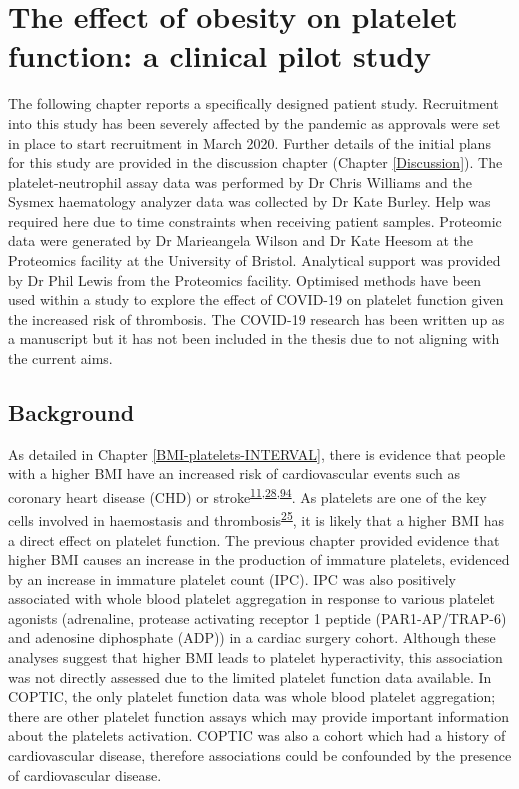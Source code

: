 \documentclass[11pt,twoside]{bristolthesis}
\begin{document}
\hypertarget{BMI-platelets-clinic}{%
\chapter{The effect of obesity on platelet function: a clinical pilot study}\label{BMI-platelets-clinic}}

The following chapter reports a specifically designed patient study. Recruitment into this study has been severely affected by the pandemic as approvals were set in place to start recruitment in March 2020. Further details of the initial plans for this study are provided in the discussion chapter (Chapter \ref{Discussion}). The platelet-neutrophil assay data was performed by Dr Chris Williams and the Sysmex haematology analyzer data was collected by Dr Kate Burley. Help was required here due to time constraints when receiving patient samples. Proteomic data were generated by Dr Marieangela Wilson and Dr Kate Heesom at the Proteomics facility at the University of Bristol. Analytical support was provided by Dr Phil Lewis from the Proteomics facility. Optimised methods have been used within a study to explore the effect of COVID-19 on platelet function given the increased risk of thrombosis. The COVID-19 research has been written up as a manuscript but it has not been included in the thesis due to not aligning with the current aims.

\hypertarget{background-2}{%
\section{Background}\label{background-2}}

As detailed in Chapter \ref{BMI-platelets-INTERVAL}, there is evidence that people with a higher BMI have an increased risk of cardiovascular events such as coronary heart disease (CHD) or stroke\textsuperscript{\protect\hyperlink{ref-Nordestgaard2012}{11},\protect\hyperlink{ref-Dale2017}{28},\protect\hyperlink{ref-Wolk2003a}{94}}. As platelets are one of the key cells involved in haemostasis and thrombosis\textsuperscript{\protect\hyperlink{ref-Koupenova2017a}{25}}, it is likely that a higher BMI has a direct effect on platelet function. The previous chapter provided evidence that higher BMI causes an increase in the production of immature platelets, evidenced by an increase in immature platelet count (IPC). IPC was also positively associated with whole blood platelet aggregation in response to various platelet agonists (adrenaline, protease activating receptor 1 peptide (PAR1-AP/TRAP-6) and adenosine diphosphate (ADP)) in a cardiac surgery cohort. Although these analyses suggest that higher BMI leads to platelet hyperactivity, this association was not directly assessed due to the limited platelet function data available. In COPTIC, the only platelet function data was whole blood platelet aggregation; there are other platelet function assays which may provide important information about the platelets activation. COPTIC was also a cohort which had a history of cardiovascular disease, therefore associations could be confounded by the presence of cardiovascular disease.
\end{document}
